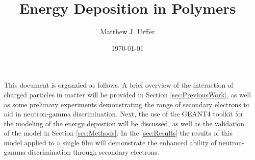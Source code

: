 \documentclass[]{report}
\title{Energy Deposition in Polymers}
\author{Matthew J. Urffer}
\date{\today}
\begin{document}
\maketitle

\listoftodos


This document is organzied as follows.
A brief overview of the interaction of charged particles in matter will be provided in Section \ref{sec:PreviousWork}, as well as some prelimary experiments demonstrating the range of secondary electrons to aid in neutron-gamma discrimination.
Next, the use of the GEANT4 toolkit for the modeling of the energy depostion will be discussed, as well as the validation of the model in Section \ref{sec:Methods}.
In the \ref{sec:Results} the results of this model applied to a single film will demonstrate the enhanced ability of neutron-gamma discrimination through secondary electrons.




\end{document}
